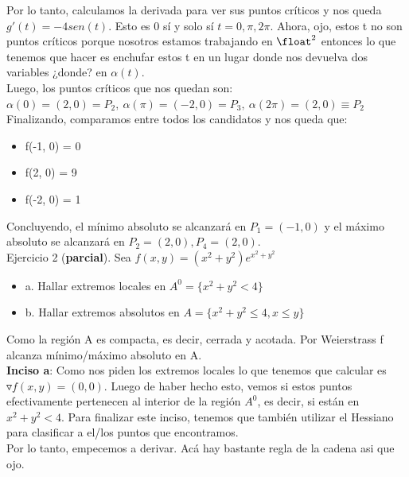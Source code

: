 \documentclass[10pt,a4paper]{article}
\begin{document}
Por lo tanto, calculamos la derivada para ver sus puntos críticos y nos queda $g'(t) = -4sen(t)$. Esto es 0 sí y solo sí $t=0, \pi, 2\pi$. Ahora, ojo, estos t no son puntos críticos porque nosotros estamos trabajando en $\float^{2}$ entonces lo que tenemos que hacer es enchufar estos t en un lugar donde nos devuelva dos variables ¿donde? en $\alpha(t)$. \\
Luego, los puntos críticos que nos quedan son: $ \alpha(0) = (2,0) = P_{2}, \ \alpha(\pi) = (-2,0) = P_{3}, \ \alpha(2\pi) = (2,0) \equiv P_{2}$ \\
Finalizando, comparamos entre todos los candidatos y nos queda que:
\begin{itemize}
    \item f(-1, 0) = 0
    \item f(2, 0) = 9
    \item f(-2, 0) = 1
\end{itemize}
Concluyendo, el mínimo absoluto se alcanzará en $P_{1} = (-1, 0)$ y el máximo absoluto se alcanzará en $P_{2} = (2,0), P_{4} = (2,0)$. \\
Ejercicio 2 (\textbf{parcial}). Sea $f(x,y) = (x^{2} + y^{2})e^{x^{2} + y^{2}}$ 
\begin{itemize}
    \item a. Hallar extremos locales en $A^{0} = \{x^{2} + y^{2} < 4\}$
    \item b. Hallar extremos absolutos en $A = \{x^{2} + y^{2} \le 4, x \le y\}$
\end{itemize}
Como la región A es compacta, es decir, cerrada y acotada. Por Weierstrass f alcanza mínimo/máximo absoluto en A. \\
\textbf{Inciso a}: Como nos piden los extremos locales lo que tenemos que calcular es $\triangledown f(x,y) = (0, 0)$. Luego de haber hecho esto, vemos si estos puntos efectivamente pertenecen al interior de la región $A^{0}$, es decir, si están en $x^{2} + y^{2} < 4$. Para finalizar este inciso, tenemos que también utilizar el Hessiano para clasificar a el/los puntos que encontramos. \\
Por lo tanto, empecemos a derivar. Acá hay bastante regla de la cadena asi que ojo.
\end{document}
